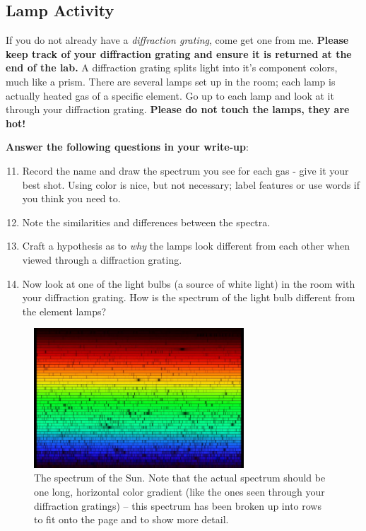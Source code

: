 \documentclass[11pt]{article}
\begin{document}
\subsection{Lamp Activity}

If you do not already have a \emph{diffraction grating}, come get one from me. \textbf{Please keep track of your diffraction grating and ensure it is returned at the end of the lab.} A diffraction grating splits light into it's component colors, much like a prism. There are several lamps set up in the room; each lamp is actually heated gas of a specific element. Go up to each lamp and look at it through your diffraction grating. \textbf{Please do not touch the lamps, they are hot!}
\bigskip 

\textbf{Answer the following questions in your write-up}:
\begin{enumerate}
    \setcounter{enumi}{10}
    \item Record the name and draw the spectrum you see for each gas - give it your best shot. Using color is nice, but not necessary; label features or use words if you think you need to.
    \item Note the similarities and differences between the spectra.
    \item Craft a hypothesis as to \textit{why} the lamps look different from each other when viewed through a diffraction grating.
    \item Now look at one of the light bulbs (a source of white light) in the room with your diffraction grating. How is the spectrum of the light bulb different from the element lamps?
\end{enumerate}

\begin{figure}[h!]
    \centering
    \includegraphics[width=0.7\textwidth]{Images/sun_spec.jpg}
    \caption{The spectrum of the Sun. Note that the actual spectrum should be one long, horizontal color gradient (like the ones seen through your diffraction gratings) -- this spectrum has been broken up into rows to fit onto the page and to show more detail.}
    \label{fig:sun}
\end{figure}
\end{document}
